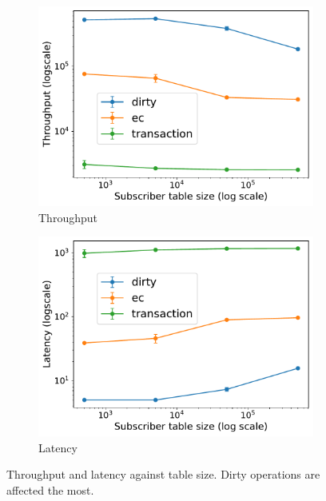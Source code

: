 \begin{figure}[htp]
  \centering
  \begin{subfigure}[t]{0.95\columnwidth}
    \centering
    \includegraphics[width=\columnwidth]{figures/tp_table_caelum.pdf}
    \caption{Throughput}
    \label{fig:tp table caelum}
  \end{subfigure}
  
  \begin{subfigure}[t]{0.95\columnwidth}
    \centering
    \includegraphics[width=\columnwidth]{figures/lat_table_caelum.pdf}
    \caption{Latency}
    \label{fig:lat table caelum}
  \end{subfigure}
  \caption{Throughput and latency against table size. Dirty operations are affected
  the most.}
  \label{fig:table caelum}
\end{figure}

